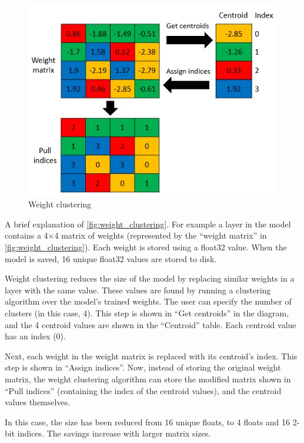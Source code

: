 \begin{figure}[ht]
    \includegraphics[width=\textwidth]{images/introduction/weight_clustering.png}
    \centering
    \caption{Weight clustering}\label{fig:weight_clustering}
\end{figure}

A brief explanation of \autoref{fig:weight_clustering}. For example a layer in
the model contains a 4$\times$4 matrix of weights (represented by the
``weight matrix'' in \autoref{fig:weight_clustering}). Each weight is stored
using a float32 value. When the model is saved, 16 unique float32 values are
stored to disk.

Weight clustering reduces the size of the model by replacing similar weights in
a layer with the same value. These values are found by running a clustering
algorithm over the model’s trained weights. The user can specify the number of
clusters (in this case, 4). This step is shown in ``Get centroids'' in the
diagram, and the 4 centroid values are shown in the ``Centroid'' table. Each
centroid value has an index (0).

Next, each weight in the weight matrix is replaced with its centroid’s index.
This step is shown in ``Assign indices''. Now, instead of storing the original
weight matrix, the weight clustering algorithm can store the modified matrix
shown in ``Pull indices'' (containing the index of the centroid values), and
the centroid values themselves.

In this case, the size has been reduced from 16 unique floats, to 4 floats and
16 2-bit indices. The savings increase with larger matrix sizes.

